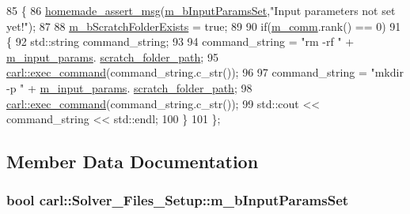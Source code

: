 \begin{DoxyCode}
85 \{
86     \hyperlink{common__header_8h_a593ccc80b790b2268653fcf6597bf451}{homemade\_assert\_msg}(\hyperlink{classcarl_1_1_solver___files___setup_a7187af3c4a90be2d8ad2a25c11c0e910}{m\_bInputParamsSet},\textcolor{stringliteral}{"Input parameters not set
       yet!"});
87 
88     \hyperlink{classcarl_1_1_solver___files___setup_ac59627eab870e65887560595d0fbc025}{m\_bScratchFolderExists} = \textcolor{keyword}{true};
89     
90     \textcolor{keywordflow}{if}(\hyperlink{classcarl_1_1_solver___files___setup_aa8049195d5e383a0ca4295795e3f5751}{m\_comm}.rank() == 0)
91     \{
92         std::string command\_string;
93 
94         command\_string = \textcolor{stringliteral}{"rm -rf "} + \hyperlink{classcarl_1_1_solver___files___setup_aa5804bf6c6e506b382766333f232d3d5}{m\_input\_params}.
      \hyperlink{structcarl_1_1feti__setup__init__params_a57e553748427905076bae85d239f9537}{scratch\_folder\_path};
95         \hyperlink{namespacecarl_a54249fee021b3d53e1a7ae7208292437}{carl::exec\_command}(command\_string.c\_str());
96 
97         command\_string = \textcolor{stringliteral}{"mkdir -p "} + \hyperlink{classcarl_1_1_solver___files___setup_aa5804bf6c6e506b382766333f232d3d5}{m\_input\_params}.
      \hyperlink{structcarl_1_1feti__setup__init__params_a57e553748427905076bae85d239f9537}{scratch\_folder\_path};
98         \hyperlink{namespacecarl_a54249fee021b3d53e1a7ae7208292437}{carl::exec\_command}(command\_string.c\_str());
99         std::cout << command\_string << std::endl;
100     \}
101 \};
\end{DoxyCode}


\subsection{Member Data Documentation}
\hypertarget{classcarl_1_1_solver___files___setup_a7187af3c4a90be2d8ad2a25c11c0e910}{}
\subsubsection[{m\+\_\+b\+Input\+Params\+Set}]{\setlength{\rightskip}{0pt plus 5cm}bool carl\+::\+Solver\+\_\+\+Files\+\_\+\+Setup\+::m\+\_\+b\+Input\+Params\+Set\hspace{0.3cm}{\ttfamily [protected]}}\label{classcarl_1_1_solver___files___setup_a7187af3c4a90be2d8ad2a25c11c0e910}


